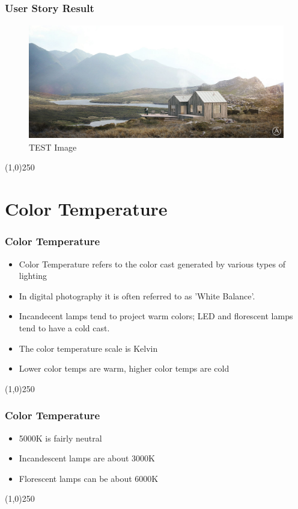 \begin{frame}
\frametitle{User Story Result}
\begin{figure}
	\centering
		\includegraphics[height=5cm]{img/cabana_01_large.jpg}
	\caption{TEST Image}
	\label{fig:lightingtypes}
\end{figure}
\end{frame}
\begin{center}\line(1,0){250}\end{center}


\section{Color Temperature}

\begin{frame}
\frametitle{Color Temperature}
\begin{itemize}
	\item Color Temperature refers to the color cast generated by various types of lighting
	\item In digital photography it is often referred to as 'White Balance'.
	\item Incandecent lamps tend to project warm colors; LED and florescent lamps tend to have a cold cast.
	\item The color temperature scale is Kelvin
	\item Lower color temps are warm, higher color temps are cold
\end{itemize}
\end{frame}
\begin{center}\line(1,0){250}\end{center}

\begin{frame}
\frametitle{Color Temperature}
\begin{itemize}
	\item 5000K is fairly neutral
	\item Incandescent lamps are about 3000K
	\item Florescent lamps can be about 6000K
\end{itemize}
\end{frame}
\begin{center}\line(1,0){250}\end{center}



